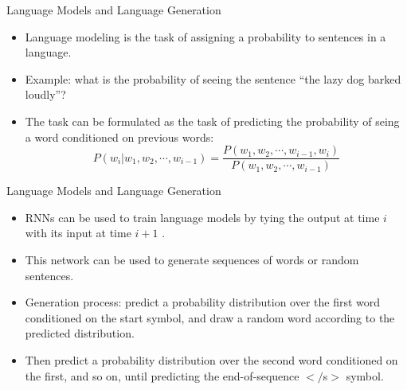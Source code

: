 

\begin{frame}{Language Models and Language Generation}
\begin{scriptsize}
\begin{itemize}
\item Language modeling is the task of assigning a probability to sentences in a language.
\item Example: what is the probability of seeing the sentence ``the lazy dog barked loudly''?
\item The task can be formulated as the task of predicting the probability of seing a word conditioned on previous words:
\begin{displaymath}
 P(w_i | w_1, w_2, \cdots, w_{i-1}) = \frac{P(w_1, w_2, \cdots, w_{i-1}, w_i)}{P(w_1, w_2, \cdots, w_{i-1})}  
\end{displaymath}

\end{itemize}
\end{scriptsize}
\end{frame}


\begin{frame}{Language Models and Language Generation}
\begin{scriptsize}
\begin{itemize}
\item  RNNs can be used to train language models by tying the output at time $i$ with its input at time $i + 1$ .
\item This network can be used to generate sequences of words or random sentences.
\item Generation process: predict a probability distribution over the first word conditioned on the start symbol, and draw a random word according to the predicted
distribution.

\item Then predict a probability distribution over the second word conditioned on the first, and so on, until predicting the end-of-sequence $</$s$>$ symbol.
\end{itemize}
\end{scriptsize}
\end{frame}


